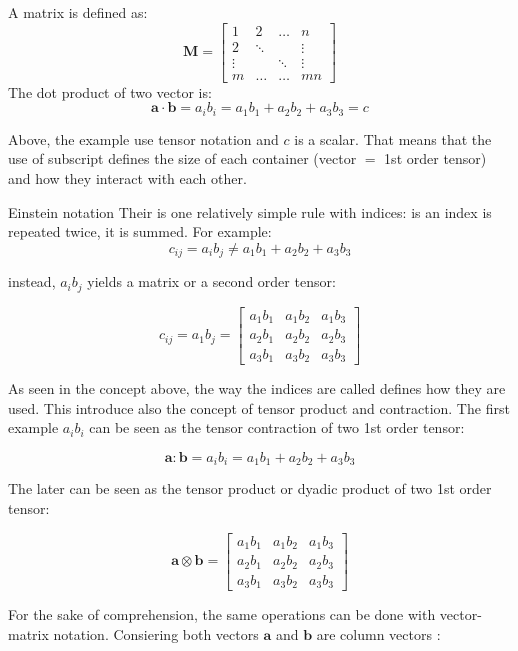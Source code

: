 A matrix is defined as:
$$ 
    \boldsymbol{M} = 
    \begin{bmatrix}
        1   & 2 &\dots& n \\
        2   & \ddots &    & \vdots\\
        \vdots &  & \ddots  & \vdots\\
        m   & \dots & \dots  & mn    
    \end{bmatrix}    
$$
The dot product of two vector is: 
$$ \mathbf{a}\cdot \mathbf{b} = a_i b_i = a_1b_1 + a_2b_2 + a_3b_3 = c$$


Above, the example use tensor notation and $c$ is a scalar. That means that the use of subscript defines the size of each container (vector $=$ 1st order tensor) and how they interact with each other. 
\begin{keyconcept}{Einstein notation}
    \label{keyconcept:einstein}
    Their is one relatively simple rule with indices: is an index is repeated twice, it is summed. For example:
    $$c_{ij} = a_ib_j \neq a_1b_1 + a_2b_2 + a_3b_3$$

    instead, $a_ib_j$ yields a matrix or a second order tensor:

    $$c_{ij} =  a_1b_j = 
    \begin{bmatrix}
        a_1b_1 & a_1b_2 & a_1b_3 \\
        a_2b_1 & a_2b_2 & a_2b_3 \\
        a_3b_1 & a_3b_2 & a_3b_3
    \end{bmatrix}  $$
\end{keyconcept}

As seen in the concept above, the way the indices are called defines how they are used. This introduce also the concept of tensor product and contraction. The first example $a_ib_i$ can be seen as the tensor contraction of two 1st order tensor:

$$\mathbf{a} : \mathbf{b} = a_ib_i = a_1b_1 + a_2b_2 + a_3b_3 $$

The later can be seen as the tensor product or dyadic product of two 1st order tensor:

$$ \mathbf{a} \otimes \mathbf{b} =     
    \begin{bmatrix}
        a_1b_1 & a_1b_2 & a_1b_3 \\
        a_2b_1 & a_2b_2 & a_2b_3 \\
        a_3b_1 & a_3b_2 & a_3b_3
    \end{bmatrix}  
$$

For the sake of comprehension, the same operations can be done with vector-matrix notation. Consiering both vectors $\mathbf{a}$ and $\mathbf{b}$ are column vectors :

